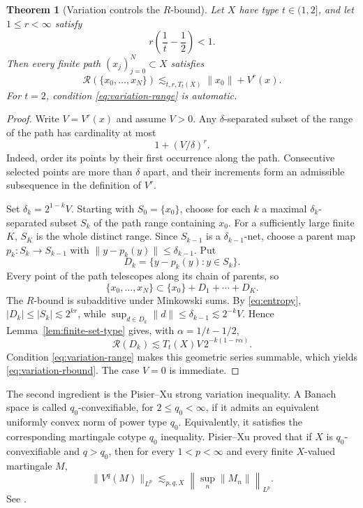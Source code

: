 \documentclass[11pt]{article}
\newtheorem{theorem}{Theorem}[section]
\theoremstyle{definition}
\newcommand{\cR}{\mathcal R}
\newcommand{\1}{\mathbf 1}
\begin{document}
\begin{theorem}[Variation controls the $R$-bound]\label{thm:variation-rbound}
Let $X$ have type $t\in(1,2]$, and let $1\le r<\infty$ satisfy
\begin{equation}\label{eq:variation-range}
 r\left(\frac1t-\frac12\right)<1.
\end{equation}
Then every finite path $(x_j)_{j=0}^N\subset X$ satisfies
\begin{equation}\label{eq:variation-rbound}
 \cR(\{x_0,\ldots,x_N\})
 \lesssim_{t,r,T_t(X)} \|x_0\|+V^r(x).
\end{equation}
For $t=2$, condition \eqref{eq:variation-range} is automatic.
\end{theorem}

\begin{proof}
Write $V=V^r(x)$ and assume $V>0$.  Any $\delta$-separated subset of the range
of the path has cardinality at most
\begin{equation}\label{eq:entropy}
 1+(V/\delta)^r.
\end{equation}
Indeed, order its points by their first occurrence along the path.  Consecutive
selected points are more than $\delta$ apart, and their increments form an
admissible subsequence in the definition of $V^r$.

Set $\delta_k=2^{1-k}V$.  Starting with $S_0=\{x_0\}$, choose for each $k$ a
maximal $\delta_k$-separated subset $S_k$ of the path range containing $x_0$.
For a sufficiently large finite $K$, $S_K$ is the whole distinct range.  Since
$S_{k-1}$ is a $\delta_{k-1}$-net, choose a parent map
$p_k:S_k\to S_{k-1}$ with
$\|y-p_k(y)\|\le\delta_{k-1}$.  Put
\[
 D_k=\{y-p_k(y):y\in S_k\}.
\]
Every point of the path telescopes along its chain of parents, so
\[
 \{x_0,\ldots,x_N\}\subset \{x_0\}+D_1+\cdots+D_K.
\]
The $R$-bound is subadditive under Minkowski sums.  By
\eqref{eq:entropy}, $|D_k|\le|S_k|\lesssim 2^{kr}$, while
$\sup_{d\in D_k}\|d\|\le\delta_{k-1}\lesssim 2^{-k}V$.  Hence
Lemma~\ref{lem:finite-set-type} gives, with
$\alpha=1/t-1/2$,
\[
 \cR(D_k)\lesssim T_t(X)V\,2^{-k(1-r\alpha)}.
\]
Condition \eqref{eq:variation-range} makes this geometric series summable,
which yields \eqref{eq:variation-rbound}.  The case $V=0$ is immediate.
\end{proof}

The second ingredient is the Pisier--Xu strong variation inequality.  A Banach
space is called $q_0$-convexifiable, for $2\le q_0<\infty$, if it admits an
equivalent uniformly convex norm of power type $q_0$.  Equivalently, it
satisfies the corresponding martingale cotype $q_0$ inequality.  Pisier--Xu proved that if $X$ is
$q_0$-convexifiable and $q>q_0$, then for every $1<p<\infty$ and every finite
$X$-valued martingale $M$,
\begin{equation}\label{eq:PX}
 \|V^q(M)\|_{L^p}
 \lesssim_{p,q,X}
 \left\|\sup_n\|M_n\|\right\|_{L^p}.
\end{equation}
See \cite[Theorem 4.2]{PisierXu1988}.
\end{document}
